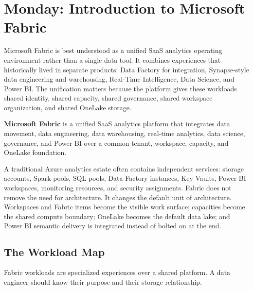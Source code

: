 \section{Monday: Introduction to Microsoft Fabric}
Microsoft Fabric is best understood as a unified SaaS analytics operating environment rather than a single data tool. It combines experiences that historically lived in separate products: Data Factory for integration, Synapse-style data engineering and warehousing, Real-Time Intelligence, Data Science, and Power BI. The unification matters because the platform gives these workloads shared identity, shared capacity, shared governance, shared workspace organization, and shared OneLake storage.

\begin{definitionbox}
\textbf{Microsoft Fabric} is a unified SaaS analytics platform that integrates data movement, data engineering, data warehousing, real-time analytics, data science, governance, and Power BI over a common tenant, workspace, capacity, and OneLake foundation.
\end{definitionbox}

A traditional Azure analytics estate often contains independent services: storage accounts, Spark pools, SQL pools, Data Factory instances, Key Vaults, Power BI workspaces, monitoring resources, and security assignments. Fabric does not remove the need for architecture. It changes the default unit of architecture. Workspaces and Fabric items become the visible work surface; capacities become the shared compute boundary; OneLake becomes the default data lake; and Power BI semantic delivery is integrated instead of bolted on at the end.

\subsection{The Workload Map}
Fabric workloads are specialized experiences over a shared platform. A data engineer should know their purpose and their storage relationship.

